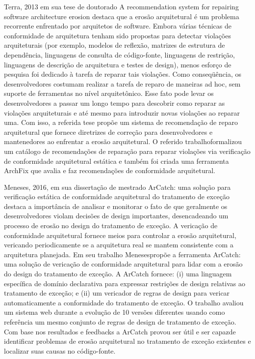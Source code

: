 \documentclass[
	12pt,				%
	openright,			%
	twoside,			%
	a4paper,			%
	english,			%
	french,				%
	spanish,			%
	brazil,				%
	]{abntex2}
\begin{document}
Terra, 2013 em sua tese de doutorado \textquotedbl{}A recommendation
system for repairing software architecture erosion\textquotedbl{}
destaca que a erosão arquitetural é um problema recorrente enfrentado
por arquitetos de software. Embora várias técnicas de conformidade
de arquitetura tenham sido propostas para detectar violações arquiteturais
(por exemplo, modelos de reflexão, matrizes de estrutura de dependência,
linguagens de consulta de código-fonte, linguagens de restrição, linguagens
de descrição de arquitetura e testes de design), menos esforço de
pesquisa foi dedicado à tarefa de reparar tais violações. Como conseqüência,
os desenvolvedores costumam realizar a tarefa de reparo de maneiras
ad hoc, sem suporte de ferramentas no nível arquitetônico. Esse fato
pode levar os desenvolvedores a passar um longo tempo para descobrir
como reparar as violações arquiteturais e até mesmo para introduzir
novas violações ao reparar uma. Com isso, a referida tese propõe um
sistema de recomendação de reparo arquitetural que fornece diretrizes
de correção para desenvolvedores e mantenedores ao enfrentar a erosão
arquitetural. O referido trabalhoformalizou um catálogo de recomendações
de reparação para reparar violações via verificação de conformidade
arquitetural estática e também foi criada uma ferramenta ArchFix que
avalia e faz recomendações de conformidade arquitetural.

Meneses, 2016, em sua dissertação de mestrado \textquotedbl{}ArCatch:
uma solução para verificação estática de conformidade arquitetural
do tratamento de exceção\textquotedbl{} destaca a importância de analisar
e monitorar o fato de que geralmente os desenvolvedores violam decisões
de design importantes, desencadeando um processo de erosão no design
do tratamento de exceção. A vericação de conformidade arquitetural
fornece meios para controlar a erosão arquitetural, vericando periodicamente
se a arquitetura real se mantem consistente com a arquitetura planejada.
Em seu trabalho Menesespropõe a ferramenta ArCatch: uma solução de
vericação de conformidade arquitetural para lidar com a erosão do
design do tratamento de exceção. A ArCatch fornece: (i) uma linguagem
específica de domínio declarativa para expressar restrições de design
relativas ao tratamento de exceção; e (ii) um vericador de regras
de design para vericar automaticamente a conformidade do tratamento
de exceção. O trabalho avaliou um sistema web durante a evolução de
10 versões diferentes usando como referência um mesmo conjunto de
regras de design de tratamento de exceção. Com base nos resultados
e feedbacks a ArCatch provou ser útil e ser capazde identificar problemas
de erosão arquitetural no tratamento de exceção existentes e localizar
suas causas no código-fonte.
\end{document}

